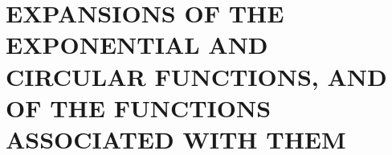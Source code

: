 \section{EXPANSIONS OF THE EXPONENTIAL AND CIRCULAR FUNCTIONS, AND OF THE FUNCTIONS ASSOCIATED WITH THEM}

